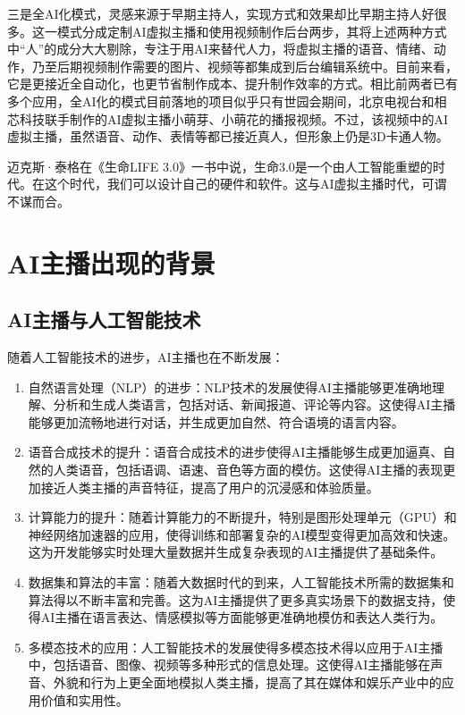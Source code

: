 \documentclass[11pt, a4paper, oneside]{ctexbook}
\begin{document}
三是全AI化模式，灵感来源于早期主持人，实现方式和效果却比早期主持人好很多。这一模式分成定制AI虚拟主播和使用视频制作后台两步，其将上述两种方式中“人”的成分大大剔除，专注于用AI来替代人力，将虚拟主播的语音、情绪、动作，乃至后期视频制作需要的图片、视频等都集成到后台编辑系统中。目前来看，它是更接近全自动化，也更节省制作成本、提升制作效率的方式。相比前两者已有多个应用，全AI化的模式目前落地的项目似乎只有世园会期间，北京电视台和相芯科技联手制作的AI虚拟主播小萌芽、小萌花的播报视频。不过，该视频中的AI虚拟主播，虽然语音、动作、表情等都已接近真人，但形象上仍是3D卡通人物。

迈克斯·泰格在《生命LIFE 3.0》一书中说，生命3.0是一个由人工智能重塑的时代。在这个时代，我们可以设计自己的硬件和软件。这与AI虚拟主播时代，可谓不谋而合。
\chapter{AI主播出现的背景}

\section{AI主播与人工智能技术}
随着人工智能技术的进步，AI主播也在不断发展：

\begin{enumerate}
    \item 自然语言处理（NLP）的进步：NLP技术的发展使得AI主播能够更准确地理解、分析和生成人类语言，包括对话、新闻报道、评论等内容。这使得AI主播能够更加流畅地进行对话，并生成更加自然、符合语境的语言内容。
    \item 语音合成技术的提升：语音合成技术的进步使得AI主播能够生成更加逼真、自然的人类语音，包括语调、语速、音色等方面的模仿。这使得AI主播的表现更加接近人类主播的声音特征，提高了用户的沉浸感和体验质量。
    \item 计算能力的提升：随着计算能力的不断提升，特别是图形处理单元（GPU）和神经网络加速器的应用，使得训练和部署复杂的AI模型变得更加高效和快速。这为开发能够实时处理大量数据并生成复杂表现的AI主播提供了基础条件。
    \item 数据集和算法的丰富：随着大数据时代的到来，人工智能技术所需的数据集和算法得以不断丰富和完善。这为AI主播提供了更多真实场景下的数据支持，使得AI主播在语言表达、情感模拟等方面能够更准确地模仿和表达人类行为。
    \item 多模态技术的应用：人工智能技术的发展使得多模态技术得以应用于AI主播中，包括语音、图像、视频等多种形式的信息处理。这使得AI主播能够在声音、外貌和行为上更全面地模拟人类主播，提高了其在媒体和娱乐产业中的应用价值和实用性。
\end{enumerate}
\end{document}

